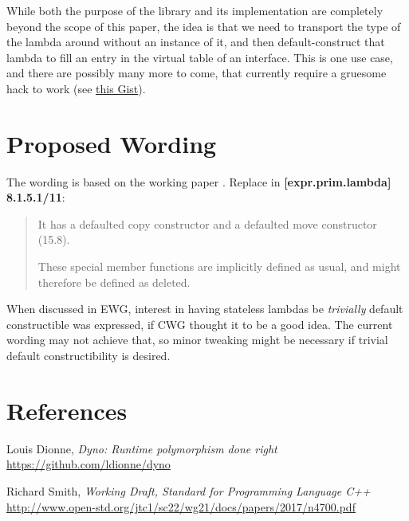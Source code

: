 \documentclass{wg21}
\begin{document}
While both the purpose of the library and its implementation are completely
beyond the scope of this paper, the idea is that we need to transport the
type of the lambda around without an instance of it, and then default-construct
that lambda to fill an entry in the virtual table of an interface. This is one
use case, and there are possibly many more to come, that currently require a
gruesome hack to work (see \href{https://github.com/ldionne/dyno/blob/03eaeded898225660787f03655edb89642a72e7c/include/dyno/detail/empty_object.hpp#L13}{this Gist}).


\section{Proposed Wording}
The wording is based on the working paper \cite{N4700}. Replace in
\textbf{[expr.prim.lambda] 8.1.5.1/11}:

\begin{quote}
  It has a defaulted copy constructor and a defaulted move constructor (15.8).
  \begin{note}
  These special member functions are implicitly defined as usual, and might
  therefore be defined as deleted.
  \end{note}
\end{quote}

When discussed in EWG, interest in having stateless lambdas be \textit{trivially}
default constructible was expressed, if CWG thought it to be a good idea. The
current wording may not achieve that, so minor tweaking might be necessary if
trivial default constructibility is desired.


\section{References}
\renewcommand{\section}[2]{}%
\begin{thebibliography}{9}

    Louis Dionne,
    \emph{Dyno: Runtime polymorphism done right}\newline
    \url{https://github.com/ldionne/dyno}

    Richard Smith,
    \emph{Working Draft, Standard for Programming Language C++}\newline
    \url{http://www.open-std.org/jtc1/sc22/wg21/docs/papers/2017/n4700.pdf}

\end{thebibliography}
\end{document}
